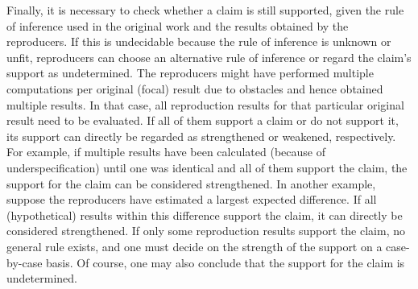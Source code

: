 \documentclass[authordate, meta]{jote-new-article}
\begin{document}
	Finally, it is necessary to check whether a claim is still supported, given the rule of inference used in the original work and the results obtained by the reproducers. If this is undecidable because the rule of inference is unknown or unfit, reproducers can choose an alternative rule of inference or regard the claim's support as undetermined. The reproducers might have performed multiple computations per original (focal) result due to obstacles and hence obtained multiple results. In that case, all reproduction results for that particular original result need to be evaluated. If all of them support a claim or do not support it, its support can directly be regarded as strengthened or weakened, respectively. For example, if multiple results have been calculated (because of underspecification) until one was identical and all of them support the claim, the support for the claim can be considered strengthened. In another example, suppose the reproducers have estimated a largest expected difference. If all (hypothetical) results within this difference support the claim, it can directly be considered strengthened. If only some reproduction results support the claim, no general rule exists, and one must decide on the strength of the support on a case-by-case basis. Of course, one may also conclude that the support for the claim is undetermined.
\end{document}
